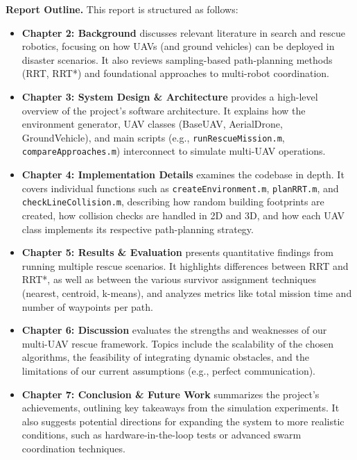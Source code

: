 \documentclass[12pt,a4paper]{report}
\begin{document}
\textbf{Report Outline.} This report is structured as follows:
\begin{itemize}
    \item \textbf{Chapter 2: Background} discusses relevant literature in search 
          and rescue robotics, focusing on how UAVs (and ground vehicles) can be 
          deployed in disaster scenarios. It also reviews sampling-based path-planning 
          methods (RRT, RRT*) and foundational approaches to multi-robot coordination.
          
    \item \textbf{Chapter 3: System Design \& Architecture} provides a high-level 
          overview of the project’s software architecture. It explains how the 
          environment generator, UAV classes (BaseUAV, AerialDrone, GroundVehicle), 
          and main scripts (e.g., \texttt{runRescueMission.m}, \texttt{compareApproaches.m}) 
          interconnect to simulate multi-UAV operations.

    \item \textbf{Chapter 4: Implementation Details} examines the codebase in depth. 
          It covers individual functions such as \texttt{createEnvironment.m}, 
          \texttt{planRRT.m}, and \texttt{checkLineCollision.m}, describing how random 
          building footprints are created, how collision checks are handled in 2D and 3D, 
          and how each UAV class implements its respective path-planning strategy.

    \item \textbf{Chapter 5: Results \& Evaluation} presents quantitative findings 
          from running multiple rescue scenarios. It highlights differences between 
          RRT and RRT*, as well as between the various survivor assignment techniques 
          (nearest, centroid, k-means), and analyzes metrics like total mission time 
          and number of waypoints per path.

    \item \textbf{Chapter 6: Discussion} evaluates the strengths and weaknesses of 
          our multi-UAV rescue framework. Topics include the scalability of the chosen 
          algorithms, the feasibility of integrating dynamic obstacles, and the 
          limitations of our current assumptions (e.g., perfect communication).

    \item \textbf{Chapter 7: Conclusion \& Future Work} summarizes the project’s 
          achievements, outlining key takeaways from the simulation experiments. 
          It also suggests potential directions for expanding the system to more 
          realistic conditions, such as hardware-in-the-loop tests or advanced 
          swarm coordination techniques.
\end{itemize}
\end{document}
